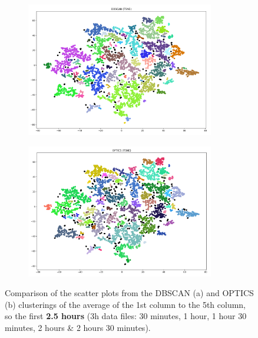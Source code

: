 \begin{figure}[H]
	\centering
	\begin{subfigure}{.5\textwidth}
    \centering
    \includegraphics[width=0.9\textwidth]{./images/clusteringResults/3h-5-DBSCAN.png}
  \end{subfigure}%
  \begin{subfigure}{.5\textwidth}
    \centering
    \includegraphics[width=0.9\textwidth]{./images/clusteringResults/3h-5-OPTICS.png}
	\end{subfigure}
	\caption{Comparison of the scatter plots from the DBSCAN (a) and OPTICS (b) clusterings of the average of the 1st column to the 5th column, so the first \textbf{2.5 hours} (3h data files: 30 minutes, 1 hour, 1 hour 30 minutes, 2 hours \& 2 hours 30 minutes).}
  \label{figure:finalClustering3h-5}
\end{figure}


